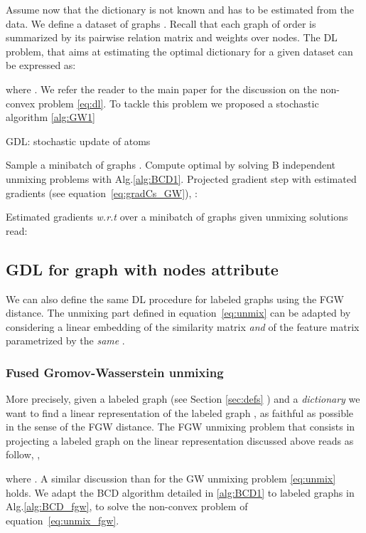 \documentclass{article}
\def\eqref#1{equation~\ref{#1}}
\begin{document}
	Assume now that the dictionary  is not known
	and has to be estimated from the data.
	We define a dataset of  graphs . Recall that each graph  of
	order  is summarized by its pairwise relation matrix  and weights  over nodes.
	The DL problem, that aims at estimating the optimal dictionary
	for a given dataset can be expressed as:
	
	where . We refer the reader to the main paper for the discussion on the non-convex problem \ref{eq:dl}. To tackle this problem we proposed a stochastic algorithm \ref{alg:GW1}
	
	\begin{algorithm}[h]
		\caption{GDL: stochastic update of atoms }
		\label{alg:GW1}
		\begin{algorithmic}[1]
			\STATE Sample a minibatch of graphs  .
			\STATE Compute optimal  by solving B independent unmixing problems with Alg.\ref{alg:BCD1}. 
			\STATE Projected gradient step with estimated gradients  (see \eqref{eq:gradCs_GW}), : \vspace{-2mm}
			
		\end{algorithmic}
	\end{algorithm}
	Estimated gradients \emph{w.r.t}  over a minibatch of graphs  given unmixing solutions  read:
	
	\subsection{GDL for graph with nodes attribute}
	We can also define the same DL procedure for labeled graphs using the FGW distance. The unmixing part defined in \eqref{eq:unmix} can be adapted by considering a linear embedding of the similarity matrix \emph{and} of the feature matrix parametrized by the \emph{same} . 
	\subsubsection{Fused Gromov-Wasserstein unmixing}
	More precisely, given a labeled graph  (see Section \ref{sec:defs} ) and a \emph{dictionary}
	  we want to find a linear representation  of the labeled graph , as faithful as
	possible in the sense of the FGW distance. The FGW unmixing problem that consists in projecting a labeled graph on the linear representation discussed above reads as follow, , 
	
	
	
	where . A similar discussion than for the GW unmixing problem \ref{eq:unmix} holds. We adapt the BCD algorithm detailed in \ref{alg:BCD1} to labeled graphs in Alg.\ref{alg:BCD_fgw}, to solve the non-convex problem of \eqref{eq:unmix_fgw}.
	
\end{document}

